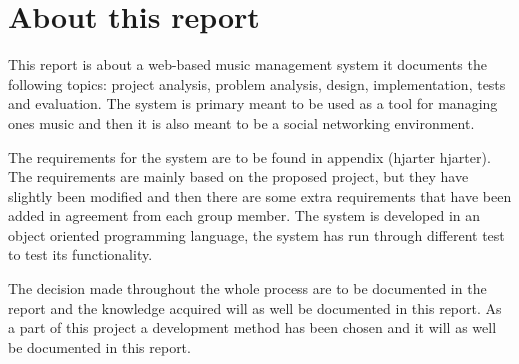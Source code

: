 \section{About this report}
This report is about a web-based music management system it documents the following topics: project analysis, problem analysis, design, implementation, tests and evaluation. The system is primary meant to be used as a tool for managing ones music and then it is also meant to be a social networking environment.

The requirements for the system are to be found in appendix (hjarter hjarter). The requirements are mainly based on the proposed project, but they have slightly been modified and then there are some extra requirements that have been added in agreement from each group member. The system is developed in an object oriented programming language, the system has run through different test to test its functionality.

The decision made throughout the whole process are to be documented in the report and the knowledge acquired will as well be documented in this report. As a part of this project a development method has been chosen and it will as well be documented in this report.